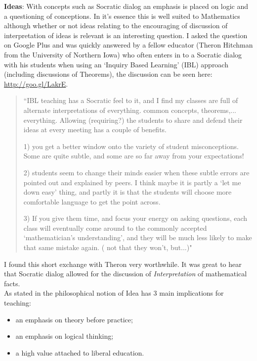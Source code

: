 \documentclass[a4paper,12pt]{article}
\begin{document}
\textbf{Ideas}: With concepts such as Socratic dialog \cite{Platoa} an emphasis is placed on logic and a questioning of conceptions. In it's essence this is well suited to Mathematics although whether or not ideas relating to the encouraging of discussion of interpretation of ideas is relevant is an interesting question. I asked the question on Google Plus and was quickly answered by a fellow educator (Theron Hitchman from the University of Northern Iowa) who often enters in to a Socratic dialog with his students when using an `Inquiry Based Learning' (IBL) approach \cite{Kember2007a} (including discussions of Theorems), the discussion can be seen here: \url{http://goo.gl/LakrE}.

\begin{quote}
``IBL teaching has a Socratic feel to it, and I find my classes are full of alternate interpretations of everything. common concepts, theorems,... everything. Allowing (requiring?) the students to share and defend their ideas at every meeting has a couple of benefits.

1) you get a better window onto the variety of student misconceptions. Some are quite subtle, and some are so far away from your expectations!

2) students seem to change their minds easier when these subtle errors are pointed out and explained by peers. I think maybe it is partly a `let me down easy' thing, and partly it is that the students will choose more comfortable language to get the point across.

3) If you give them time, and focus your energy on asking questions, each class will eventually come around to the commonly accepted `mathematician's understanding', and they will be much less likely to make that same mistake again. ( not that they won't, but...)"
\end{quote}

I found this short exchange with Theron very worthwhile. It was great to hear that Socratic dialog allowed for the discussion of \emph{Interpretation} of mathematical facts.\\

As stated in \cite{Jordan2008a} the philosophical notion of Idea has 3 main implications for teaching:

\begin{itemize}
    \item an emphasis on theory before practice;
    \item an emphasis on logical thinking;
    \item a high value attached to liberal education.
\end{itemize}
\end{document}
